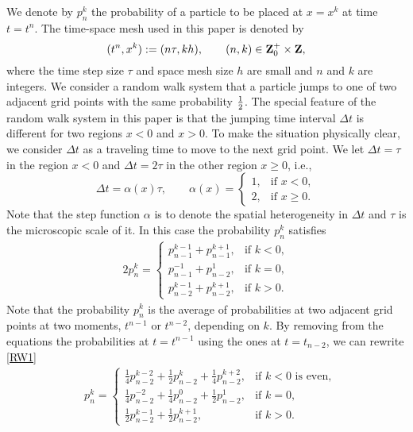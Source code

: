 \documentclass[11pt]{amsart}
\def\Z{\mathbb{Z}}
\def\Z{{\bf Z}}
\begin{document}
We denote by $p_n^k$ the probability of a particle to be placed at $x=x^k$ at time $t=t^n$. The time-space mesh used in this paper is denoted by
$$
(t^n,x^k):=(n\tau,kh),\qquad (n,k)\in \Z^+_0\times\Z,
$$
where the time step size $\tau$ and space mesh size $h$ are small and $n$ and $k$ are integers. We consider a random walk system that a particle jumps to one of two adjacent grid points with the same probability ${1\over2}$. The special feature of the random walk system in this paper is that the jumping time interval $\Delta t$ is different for two regions $x<0$ and $x>0$. To make the situation physically clear, we consider $\Delta t$ as a traveling time to move to the next grid point. We let $\Delta t=\tau$ in the region $x<0$ and $\Delta t=2\tau$ in the other region $x\ge0$, i.e.,
\begin{equation}\label{alpha}
\Delta t=\alpha(x)\tau,\qquad
\alpha(x) =
\left\{\begin{array}{ll}
        1, & \text{if } x<0,\\
        2, & \text{if } x\ge0.
        \end{array}\right.
\end{equation}
Note that the step function $\alpha$ is to denote the spatial heterogeneity in $\Delta t$ and $\tau$ is the microscopic scale of it. In this case the probability $p_n^k$ satisfies
\begin{equation} \label{RW1}\tag{RW1}
\begin{aligned}
    2p^k_n = \left\{\begin{array}{lr}
        p^{k-1} _{n-1} + p ^{k+1} _{n-1}, & \text{if } k<0,\\
        p^{-1} _{n-1} + p ^{1} _{n-2}, & \text{if } k=0,\\
        p^{k-1} _{n-2} + p ^{k+1} _{n-2}, & \text{if } k>0.
        \end{array}\right.
\end{aligned}
\end{equation}
Note that the probability $p^k_n$ is the average of probabilities at two adjacent grid points at two moments, $t^{n-1}$ or $t^{n-2}$, depending on $k$. By removing from the equations the probabilities at  $t=t^{n-1}$ using the ones at $t=t_{n-2}$, we can rewrite \eqref{RW1} 
\begin{equation} \label{RW2}\tag{RW2}
\begin{aligned}
    &p^{k}_n = \left\{\begin{array}{ll}
        \frac{1}{4}p^{k-2} _{n-2} + \frac{1}{2}p ^{k} _{n-2} + \frac{1}{4} p^{k+2}_{n-2}, & \text{if $k<0$ is even},\\
        \frac{1}{4}p^{-2} _{n-2} + \frac{1}{4}p^{0} _{n-2} + \frac{1}{2}p ^{1} _{n-2}, & \text{if $k=0$},\\
        \frac{1}{2}p^{k-1} _{n-2} + \frac{1}{2}p ^{k+1} _{n-2}, & \text{if } k>0.
        \end{array}\right. 
\end{aligned}
\end{equation}
\end{document}
